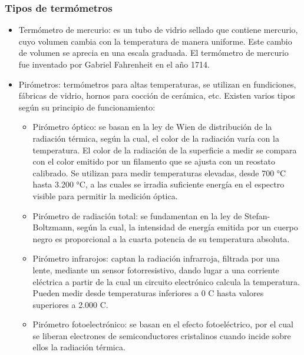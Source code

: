 				\subsubsection{Tipos de termómetros}
					\begin{itemize}
						\item Termómetro de mercurio: es un tubo de vidrio sellado que contiene mercurio, cuyo volumen cambia con la temperatura de manera uniforme. Este cambio de volumen se aprecia en una escala graduada. El termómetro de mercurio fue inventado por Gabriel Fahrenheit en el año 1714.
						
						\item Pirómetros:  termómetros para altas temperaturas, se utilizan en fundiciones, fábricas de vidrio, hornos para cocción de cerámica, etc. Existen varios tipos según su principio de funcionamiento:
						
						\begin{itemize}
							\item Pirómetro óptico: se basan en la ley de Wien de distribución de la radiación térmica, según la cual, el color de la radiación varía con la temperatura. El color de la radiación de la superficie a medir se compara con el color emitido por un filamento que se ajusta con un reostato calibrado. Se utilizan para medir temperaturas elevadas, desde 700 °C hasta 3.200 °C, a las cuales se irradia suficiente energía en el espectro visible para permitir la medición óptica.
							
							\item Pirómetro de radiación total: se fundamentan en la ley de Stefan-Boltzmann, según la cual, la intensidad de energía emitida por un cuerpo negro es proporcional a la cuarta potencia de su temperatura absoluta.
							
							\item Pirómetro infrarojos: captan la radiación infrarroja, filtrada por una lente, mediante un sensor fotorresistivo, dando lugar a una corriente eléctrica a partir de la cual un circuito electrónico calcula la temperatura. Pueden medir desde temperaturas inferiores a 0 \textdegree{}C hasta valores superiores a 2.000 \textdegree{}C.
							
							\newpage
							\thispagestyle{plain}
							
							\item Pirómetro fotoelectrónico: se basan en el efecto fotoeléctrico, por el cual se liberan electrones de semiconductores cristalinos cuando incide sobre ellos la radiación térmica.
						\end{itemize}
						

\end{itemize}
